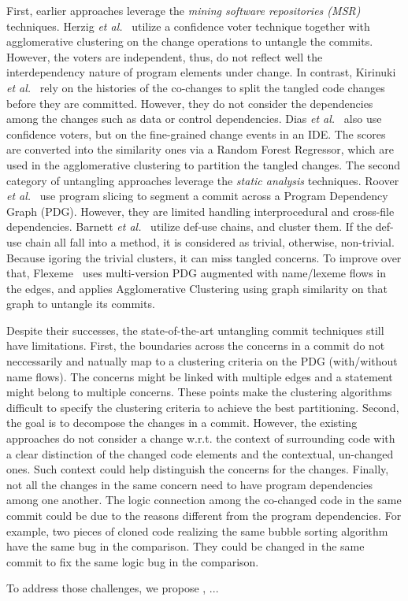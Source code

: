 First, earlier approaches leverage the {\em mining software
  repositories (MSR)} techniques. Herzig {\em et
  al.}~\cite{kim-msr13,kim-emse16} utilize a confidence voter
technique together with agglomerative clustering on the change
operations to untangle the commits.
However, the voters are independent, thus, do not reflect well the
interdependency nature of program elements under change. In contrast,
Kirinuki {\em et al.}~\cite{higo-apsec16, higo-icpc14} rely on the
histories of the co-changes to split the tangled code changes before
they are committed. However, they do not consider the dependencies
among the changes such as data or control dependencies. Dias {\em et
  al.}~\cite{dias-saner15} also use confidence voters, but on the
fine-grained change events in an IDE. The scores are converted into
the similarity ones via a Random Forest Regressor, which are used in
the agglomerative clustering to partition the tangled changes.  The
second category of untangling approaches leverage the {\em static
  analysis} techniques. Roover {\em et al.}~\cite{roover-scam18} use
program slicing to segment a commit across a Program Dependency Graph
(PDG).  However, they are limited handling interprocedural and
cross-file dependencies. Barnett {\em et al.}~\cite{barnett-icse15}
utilize def-use chains, and cluster them. If the def-use chain all
fall into a method, it is considered as trivial, otherwise,
non-trivial. Because igoring the trivial clusters, it can miss tangled
concerns. To improve over that, Flexeme~\cite{flexeme-fse20} uses
multi-version PDG augmented with name/lexeme flows in the edges, and
applies Agglomerative Clustering using graph similarity on that graph
to untangle its commits.

Despite their successes, the state-of-the-art untangling commit
techniques still have limitations. First, the boundaries across the
concerns in a commit do not neccessarily and natually map to a
clustering criteria on the PDG (with/without name flows).  The
concerns might be linked with multiple edges and a statement might
belong to multiple concerns. These points make the clustering
algorithms difficult to specify the clustering criteria to achieve the
best partitioning. Second, the goal is to decompose the changes in a
commit. However, the existing approaches do not consider a change
w.r.t. the context of surrounding code with a clear distinction of the
changed code elements and the contextual, un-changed ones. Such
context could help distinguish the concerns for the changes. Finally,
not all the changes in the same concern need to have program
dependencies among one another. The logic connection among the
co-changed code in the same commit could be due to the reasons
different from the program dependencies. For example, two pieces of
cloned code realizing the same bubble sorting algorithm have the same
bug in the comparison. They could be changed in the same commit to fix
the same logic bug in the comparison.

To address those challenges, we propose {\tool}, ...
